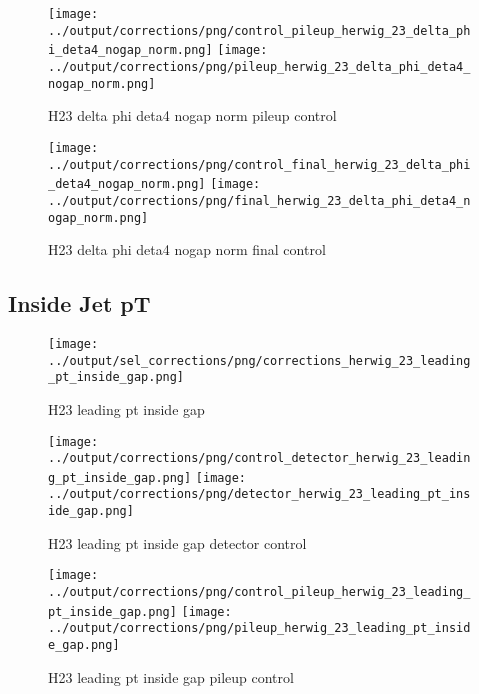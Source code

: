 \documentclass[11pt]{book}
\begin{document}
\begin{figure}[ht]
\centering
\texttt{[image: ../output/corrections/png/control\_pileup\_herwig\_23\_delta\_phi\_deta4\_nogap\_norm.png]}
\texttt{[image: ../output/corrections/png/pileup\_herwig\_23\_delta\_phi\_deta4\_nogap\_norm.png]}
\caption{H23 delta phi deta4 nogap norm pileup control}
\label{fig:H23_delta_phi_deta4_nogap_norm_pileup_control}
\end{figure}


\begin{figure}[ht]
\centering
\texttt{[image: ../output/corrections/png/control\_final\_herwig\_23\_delta\_phi\_deta4\_nogap\_norm.png]}
\texttt{[image: ../output/corrections/png/final\_herwig\_23\_delta\_phi\_deta4\_nogap\_norm.png]}
\caption{H23 delta phi deta4 nogap norm final control}
\label{fig:H23_delta_phi_deta4_nogap_norm_final_control}
\end{figure}



\clearpage
\subsection{Inside Jet pT}
\begin{figure}[ht]
\centering
\texttt{[image: ../output/sel\_corrections/png/corrections\_herwig\_23\_leading\_pt\_inside\_gap.png]}
\caption{H23 leading pt inside gap}
\label{fig:H23_leading_pt_inside_gap}
\end{figure}

\begin{figure}[ht]
\centering
\texttt{[image: ../output/corrections/png/control\_detector\_herwig\_23\_leading\_pt\_inside\_gap.png]}
\texttt{[image: ../output/corrections/png/detector\_herwig\_23\_leading\_pt\_inside\_gap.png]}
\caption{H23 leading pt inside gap detector control}
\label{fig:H23_leading_pt_inside_gap_detector_control}
\end{figure}

\begin{figure}[ht]
\centering
\texttt{[image: ../output/corrections/png/control\_pileup\_herwig\_23\_leading\_pt\_inside\_gap.png]}
\texttt{[image: ../output/corrections/png/pileup\_herwig\_23\_leading\_pt\_inside\_gap.png]}
\caption{H23 leading pt inside gap pileup control}
\label{fig:H23_leading_pt_inside_gap_pileup_control}
\end{figure}
\end{document}
